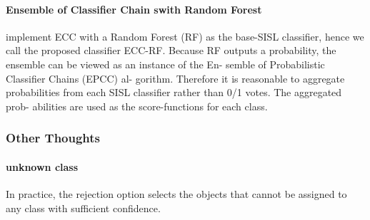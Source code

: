\paragraph{Ensemble of Classifier Chain swith Random Forest}

\cite{mlsp2} implement ECC \cite{read2011classifier} with a Random Forest (RF) as
the base-SISL classifier, hence we call the proposed
classifier ECC-RF. Because RF outputs a probability,
the ensemble can be viewed as an instance of the En-
semble of Probabilistic Classifier Chains (EPCC) al-
gorithm. Therefore it is
reasonable to aggregate probabilities from each SISL
classifier rather than 0/1 votes. The aggregated prob-
abilities are used as the score-functions for each class.

\subsubsection{Other Thoughts}

\paragraph{unknown class}

In practice, the rejection option selects the objects that cannot be assigned to any class with sufficient confidence.

